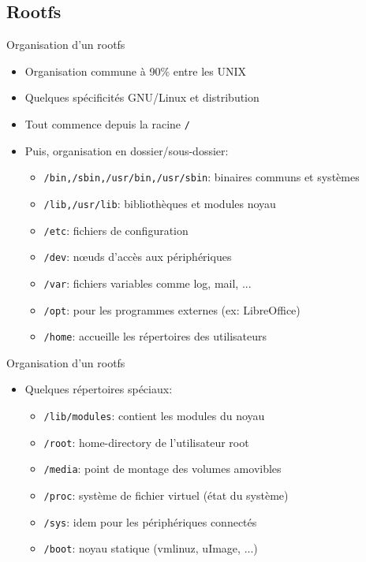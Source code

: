 \subsection{Rootfs}
\begin{frame}{Organisation d'un rootfs}
  \begin{itemize}
  \item Organisation commune à 90\% entre les UNIX
  \item Quelques spécificités GNU/Linux et distribution
  \item Tout commence depuis la racine \texttt{/}
  \item Puis, organisation en dossier/sous-dossier:
    \begin{itemize}
    \item \texttt{/bin,/sbin,/usr/bin,/usr/sbin}: binaires communs et systèmes
    \item \texttt{/lib,/usr/lib}: bibliothèques et modules noyau
    \item \texttt{/etc}: fichiers de configuration
    \item \texttt{/dev}: nœuds d'accès aux périphériques
    \item \texttt{/var}: fichiers variables comme log, mail, ...
    \item \texttt{/opt}: pour les programmes externes (ex: LibreOffice)
    \item \texttt{/home}: accueille les répertoires des utilisateurs
    \end{itemize}
  \end{itemize}
\end{frame}

\begin{frame}{Organisation d'un rootfs}
  \begin{itemize}
  \item Quelques répertoires spéciaux:
    \begin{itemize}
    \item \texttt{/lib/modules}: contient les modules du noyau
    \item \texttt{/root}: home-directory de l'utilisateur root
    \item \texttt{/media}: point de montage des volumes amovibles
    \item \texttt{/proc}: système de fichier virtuel (état du système)
    \item \texttt{/sys}: idem pour les périphériques connectés
    \item \texttt{/boot}: noyau statique (vmlinuz, uImage, ...)
    \end{itemize}
  \end{itemize}
\end{frame}

